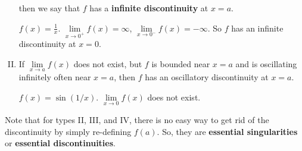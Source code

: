 \begin{enumerate}[(I)]
          then we say that $ f $ has a \textbf{infinite discontinuity} at $ x=a $.
          \begin{Example}{}{}
              $ f(x)=\frac{1}{x} $. $ \lim\limits_{{x} \to {0^+}}f(x)=\infty $,
              $ \lim\limits_{{x} \to {0^-}}f(x)=-\infty $. So $ f $ has an infinite discontinuity at $ x=0 $.
          \end{Example}
    \item If $ \lim\limits_{{x} \to {a}}f(x) $ does not exist, but $ f $ is bounded near $ x=a $
          and is oscillating infinitely often near $ x=a $, then $ f $ has an oscillatory discontinuity at $ x=a $.
          \begin{Example}{}{}
              $ f(x)=\sin(1/x) $. $ \lim\limits_{{x} \to {0}}f(x) $ does not exist.
          \end{Example}
\end{enumerate}
\begin{Remark}{}{}
    Note that for types II, III, and IV, there is no easy way to get rid of the discontinuity by simply re-defining $ f(a) $.
    So, they are \textbf{essential singularities} or \textbf{essential discontinuities}.
\end{Remark}